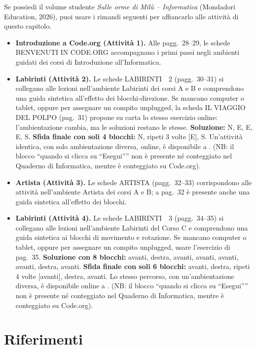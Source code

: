 \begin{rimandiquaderno}
Se possiedi il volume studente \emph{Sulle orme di Milù -- Informatica}
(Mondadori Education, 2026), puoi usare i rimandi seguenti per affiancarlo
alle attività di questo capitolo.\par\smallskip

\begin{itemize}[leftmargin=*,itemsep=5pt,topsep=4pt]
\item \textbf{Introduzione a Code.org (Attività 1).} Alle pagg.~28--29, le schede BENVENUTI IN CODE.ORG accompagnano i primi passi negli ambienti guidati dei corsi di Introduzione all'Informatica.
\item \textbf{Labirinti (Attività 2).} Le schede LABIRINTI~\textbullet{}~2 (pagg.~30--31) si collegano alle lezioni nell'ambiente Labirinti dei corsi A e B e comprendono una guida sintetica all'effetto dei blocchi-direzione. Se mancano computer o tablet, oppure per assegnare un compito unplugged, la scheda IL VIAGGIO DEL POLPO (pag.~31) propone su carta lo stesso esercizio online: l'ambientazione cambia, ma le soluzioni restano le stesse. \textbf{Soluzione:} N, E, E, E, S. \textbf{Sfida finale con soli 4 blocchi:} N, ripeti 3 volte [E], S. Un'attività identica, con solo ambientazione diversa, online, è disponibile a  . (NB: il blocco “quando si clicca su “Esegui”” non è presente né conteggiato nel
Quaderno di Informatica, mentre è conteggiato su Code.org).
\item \textbf{Artista (Attività 3).} Le schede ARTISTA (pagg.~32--33) corrispondono alle attività nell'ambiente Artista dei corsi A e B; a pag.~32 è presente anche una guida sintetica all'effetto dei blocchi.
\item \textbf{Labirinti (Attività 4).} Le schede LABIRINTI~\textbullet{}~3 (pagg.~34--35) si collegano alle lezioni nell'ambiente Labirinti del Corso C e comprendono una guida sintetica ai blocchi di movimento e rotazione. Se mancano computer o tablet, oppure per assegnare un compito unplugged, usare l'esercizio di pag.~35. \textbf{Soluzione con 8 blocchi:} avanti, destra, avanti, avanti, avanti, avanti, destra, avanti. \textbf{Sfida finale con soli 6 blocchi:} avanti, destra, ripeti 4 volte [avanti], destra, avanti. Lo stesso percorso, con un'ambientazione diversa, è disponibile online a . (NB: il blocco “quando si clicca su “Esegui”” non è presente né conteggiato nel
Quaderno di Informatica, mentre è conteggiato su Code.org).
\end{itemize}
\end{rimandiquaderno}

\section{Riferimenti}\label{riferimenti-cap7}

\printbibliography[heading=none,keyword={cap7},notcategory={attivita}]
